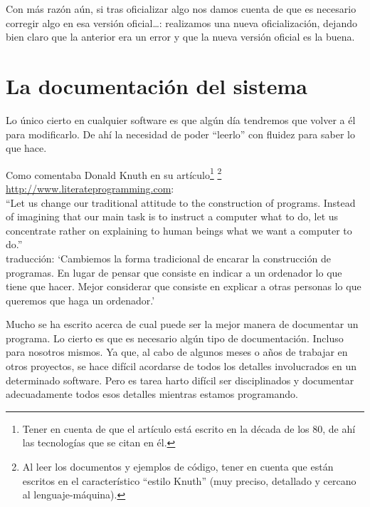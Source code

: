 \documentclass[spanish,12pt,a4paper,final,oneside]{book}
\begin{document}
Con más razón aún, si tras oficializar algo nos damos cuenta de que es necesario corregir algo en esa versión oficial…: realizamos una nueva oficialización, dejando bien claro que la anterior era un error y que la nueva versión oficial es la buena. 

\section{La documentación del sistema}
Lo único cierto en cualquier software es que algún día tendremos que volver a él para modificarlo. De ahí la necesidad de poder ``leerlo'' con fluidez para saber lo que hace.

Como comentaba Donald Knuth en su artículo\footnote{Tener en cuenta de que el artículo está escrito en la década de los 80, de ahí las tecnologías que se citan en él.}
\footnote{Al leer los documentos y ejemplos de código, tener en cuenta que están escritos en el característico ``estilo Knuth'' (muy preciso, detallado y cercano al lenguaje-máquina).}
 \url{http://www.literateprogramming.com}: 
\\``Let us change our traditional attitude to the construction of programs. Instead of imagining that our main task is to instruct a computer what to do, let us concentrate rather on explaining to human beings what we want a computer to do.''
\\traducción: ‘Cambiemos la forma tradicional de encarar la construcción de programas. En lugar de pensar que consiste en indicar a un ordenador lo que tiene que hacer. Mejor considerar que consiste en explicar a otras personas lo que queremos que haga un ordenador.’

Mucho se ha escrito acerca de cual puede ser la mejor manera de documentar un programa. Lo cierto es que es necesario algún tipo de documentación. Incluso para nosotros mismos. Ya que, al cabo de algunos meses o años de trabajar en otros proyectos, se hace difícil acordarse de todos los detalles involucrados en un determinado software. Pero es tarea harto difícil ser disciplinados y documentar adecuadamente todos esos detalles mientras estamos programando.
\end{document}
